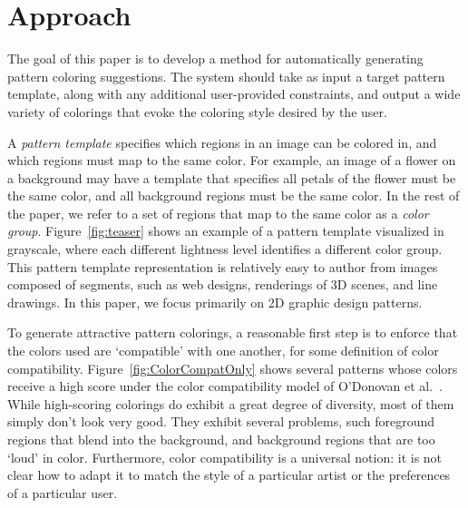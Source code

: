 \section{Approach}
\label{sec:approach}

The goal of this paper is to develop a method for automatically generating pattern coloring suggestions. The system should take as input a target pattern template, along with any additional user-provided constraints, and output a wide variety of colorings that evoke the coloring style desired by the user.

A \emph{pattern template} specifies which regions in an image can be colored in, and which regions must map to the same color. For example, an image of a flower on a background may have a template that specifies all petals of the flower must be the same color, and all background regions must be the same color. In the rest of the paper, we refer to a set of regions that map to the same color as a \emph{color group}. Figure~\ref{fig:teaser} shows an example of a pattern template visualized in grayscale, where each different lightness level identifies a different color group. This pattern template representation is relatively easy to author from images composed of segments, such as web designs, renderings of 3D scenes, and line drawings. In this paper, we focus primarily on 2D graphic design patterns. 

To generate attractive pattern colorings, a reasonable first step is to enforce that the colors used are `compatible' with one another, for some definition of color compatibility. Figure~\ref{fig:ColorCompatOnly} shows several patterns whose colors receive a high score under the color compatibility model of O'Donovan et al.~.~ While high-scoring colorings do exhibit a great degree of diversity, most of them simply don't look very good. They exhibit several problems, such foreground regions that blend into the background, and background regions that are too `loud' in color. Furthermore, color compatibility is a universal notion: it is not clear how to adapt it to match the style of a particular artist or the preferences of a particular user.

